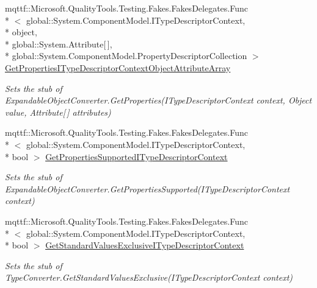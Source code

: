 \begin{DoxyCompactItemize}
mqttf\-::\-Microsoft.\-Quality\-Tools.\-Testing.\-Fakes.\-Fakes\-Delegates.\-Func\\*
$<$ global\-::\-System.\-Component\-Model.\-I\-Type\-Descriptor\-Context, \\*
object, \\*
global\-::\-System.\-Attribute\mbox{[}$\,$\mbox{]}, \\*
global\-::\-System.\-Component\-Model.\-Property\-Descriptor\-Collection $>$ \hyperlink{class_system_1_1_component_model_1_1_fakes_1_1_stub_expandable_object_converter_a86b6015ac49dcde13b379b5f621d6230}{Get\-Properties\-I\-Type\-Descriptor\-Context\-Object\-Attribute\-Array}
\begin{DoxyCompactList}\small\item\em Sets the stub of Expandable\-Object\-Converter.\-Get\-Properties(\-I\-Type\-Descriptor\-Context context, Object value, Attribute\mbox{[}$\,$\mbox{]} attributes)\end{DoxyCompactList}\item 
mqttf\-::\-Microsoft.\-Quality\-Tools.\-Testing.\-Fakes.\-Fakes\-Delegates.\-Func\\*
$<$ global\-::\-System.\-Component\-Model.\-I\-Type\-Descriptor\-Context, \\*
bool $>$ \hyperlink{class_system_1_1_component_model_1_1_fakes_1_1_stub_expandable_object_converter_a70409cb67e29b1351b529182386b05ab}{Get\-Properties\-Supported\-I\-Type\-Descriptor\-Context}
\begin{DoxyCompactList}\small\item\em Sets the stub of Expandable\-Object\-Converter.\-Get\-Properties\-Supported(\-I\-Type\-Descriptor\-Context context)\end{DoxyCompactList}\item 
mqttf\-::\-Microsoft.\-Quality\-Tools.\-Testing.\-Fakes.\-Fakes\-Delegates.\-Func\\*
$<$ global\-::\-System.\-Component\-Model.\-I\-Type\-Descriptor\-Context, \\*
bool $>$ \hyperlink{class_system_1_1_component_model_1_1_fakes_1_1_stub_expandable_object_converter_ae8aaade60f7094ffe3317c8e512aa6f3}{Get\-Standard\-Values\-Exclusive\-I\-Type\-Descriptor\-Context}
\begin{DoxyCompactList}\small\item\em Sets the stub of Type\-Converter.\-Get\-Standard\-Values\-Exclusive(\-I\-Type\-Descriptor\-Context context)\end{DoxyCompactList}\item 

\end{DoxyCompactItemize}
